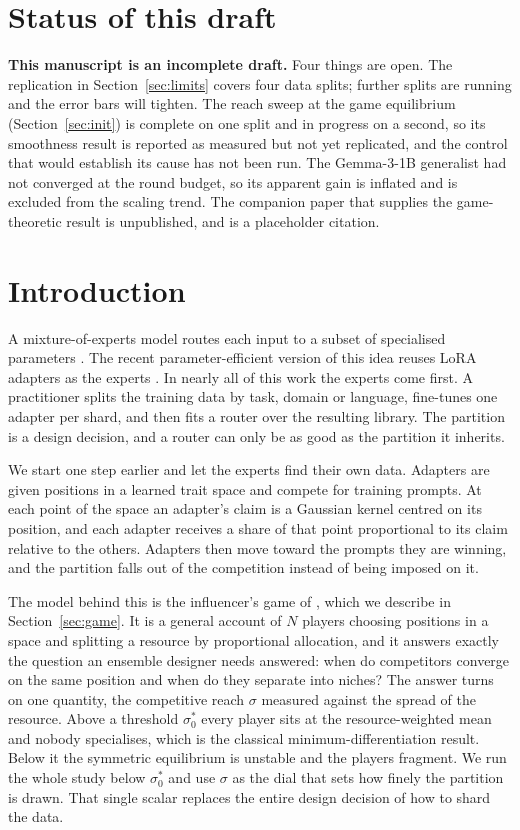 \documentclass{article}
\begin{document}
\section*{Status of this draft}
\textbf{This manuscript is an incomplete draft.} Four things are open. The replication in
Section~\ref{sec:limits} covers four data splits; further splits are running and the error bars will
tighten. The reach sweep at the game equilibrium (Section~\ref{sec:init}) is complete on one split
and in progress on a second, so its smoothness result is reported as measured but not yet replicated,
and the control that would establish its cause has not been run. The Gemma-3-1B generalist had not
converged at the round budget, so its apparent gain is inflated and is excluded from the scaling
trend. The companion paper that supplies the game-theoretic result is unpublished, and
\citet{lovett2026influencer} is a placeholder citation.

\section{Introduction}
A mixture-of-experts model routes each input to a subset of specialised parameters
\citep{shazeer2017moe,fedus2022switch}. The recent parameter-efficient version of this idea reuses
LoRA adapters as the experts \citep{hu2022lora,huang2024lorahub,yadav2024moerging}. In nearly all of
this work the experts come first. A practitioner splits the training data by task, domain or
language, fine-tunes one adapter per shard, and then fits a router over the resulting library. The
partition is a design decision, and a router can only be as good as the partition it inherits.

We start one step earlier and let the experts find their own data. Adapters are given positions in a
learned trait space and compete for training prompts. At each point of the space an adapter's claim
is a Gaussian kernel centred on its position, and each adapter receives a share of that point
proportional to its claim relative to the others. Adapters then move toward the prompts they are
winning, and the partition falls out of the competition instead of being imposed on it.

The model behind this is the influencer's game of \citet{lovett2026influencer}, which we describe in
Section~\ref{sec:game}. It is a general account of $N$ players choosing positions in a space and
splitting a resource by proportional allocation, and it answers exactly the question an ensemble
designer needs answered: when do competitors converge on the same position and when do they separate
into niches? The answer turns on one quantity, the competitive reach $\sigma$ measured against the
spread of the resource. Above a threshold $\sigma_0^*$ every player sits at the resource-weighted
mean and nobody specialises, which is the classical minimum-differentiation result. Below it the
symmetric equilibrium is unstable and the players fragment. We run the whole study below
$\sigma_0^*$ and use $\sigma$ as the dial that sets how finely the partition is drawn. That single
scalar replaces the entire design decision of how to shard the data.
\end{document}
